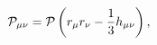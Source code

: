 \begin{equation} 
{{\mathcal P}_{\mu\nu}}={\mathcal{P}}\left({r_\mu}{r_\nu}-{1\over{3}}{h_{\mu\nu}}\right),
\end{equation}

